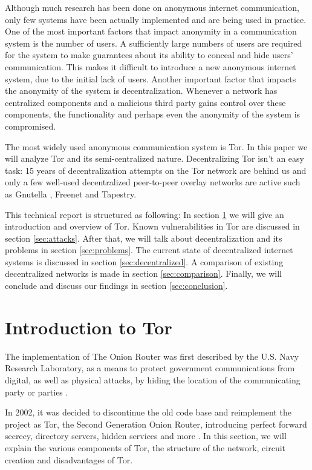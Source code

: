 \documentclass{article}
\begin{document}
	Although much research has been done on anonymous internet communication, only few systems have been actually implemented and are being used in practice. One of the most important factors that impact anonymity in a communication system is the number of users. A sufficiently large numbers of users are required for the system to make guarantees about its ability to conceal and hide users' communication. This makes it difficult to introduce a new anonymous internet system, due to the initial lack of users. Another important factor that impacts the anonymity of the system is decentralization. Whenever a network has centralized components and a malicious third party gains control over these components, the functionality and perhaps even the anonymity of the system is compromised.
	
	The most widely used anonymous communication system is Tor. In this paper we will analyze Tor and its semi-centralized nature. Decentralizing Tor isn't an easy task: 15 years of decentralization attempts on the Tor network are behind us and only a few well-used decentralized peer-to-peer overlay networks are active such as Gnutella \cite{ripeanu2001peer}, Freenet \cite{lua2005survey} and Tapestry.
	
	This technical report is structured as following: In section \ref{sec:tor} we will give an introduction and overview of Tor. Known vulnerabilities in Tor are discussed in section \ref{sec:attacks}. After that, we will talk about decentralization and its problems in section \ref{sec:problems}. The current state of decentralized internet systems is discussed in section \ref{sec:decentralized}. A comparison of existing decentralized networks is made in section \ref{sec:comparison}. Finally, we will conclude and discuss our findings in section \ref{sec:conclusion}.
	
\section{Introduction to Tor}
	\label{sec:tor}
	
	The implementation of The Onion Router was first described by the U.S. Navy Research Laboratory, as a means to protect government communications from digital, as well as physical attacks, by hiding the location of the communicating party or parties \cite{goldschlag1996hiding}.
	
	In 2002, it was decided to discontinue the old code base and reimplement the project as Tor, the Second Generation Onion Router, introducing perfect forward secrecy, directory servers, hidden services and more \cite{dingledine2004tor}. In this section, we will explain the various components of Tor, the structure of the network, circuit creation and disadvantages of Tor.
	
\end{document}
